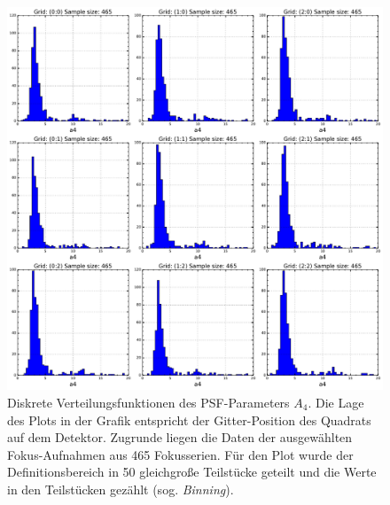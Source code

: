 \begin{figure}[H]
	\centering
	\includegraphics[scale=.40]{psf_dist/a4.pdf}
	\caption[Diskrete Verteilungsfunktionen des PSF-Parameters $A_4$]{Diskrete Verteilungsfunktionen des PSF-Parameters $A_4$. Die Lage des Plots in der Grafik entspricht der Gitter-Position des Quadrats auf dem Detektor. Zugrunde liegen die Daten der ausgewählten Fokus-Aufnahmen aus 465 Fokusserien. Für den Plot wurde der Definitionsbereich in 50 gleichgroße Teilstücke geteilt und die Werte in den Teilstücken gezählt (sog. \emph{Binning}).}
    \label{a4_dist}
\end{figure}

